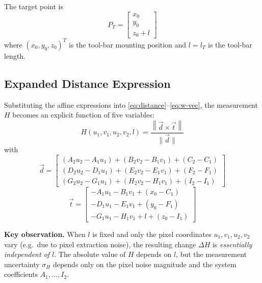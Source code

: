 The target point is
%
\begin{equation}
  P_T =
  \begin{bmatrix} x_0 \\ y_0 \\ z_0 + l \end{bmatrix}
  \label{eq:pt}
\end{equation}
%
where $(x_0, y_0, z_0)^T$ is the tool-bar mounting position
and $l = l_T$ is the tool-bar length.


\subsection{Expanded Distance Expression}
\label{sec:expanded}

Substituting the affine expressions into
\eqref{eq:distance}--\eqref{eq:w-vec},
the measurement $H$ becomes an explicit function of
five variables:
%
\begin{equation}
  H(u_1, v_1, u_2, v_2, l)
    = \frac{
        \left\| \vec{d} \times \vec{t} \right\|
      }{
        \|\vec{d}\|
      }
  \label{eq:H-expanded}
\end{equation}
%
with
%
\begin{equation}
  \vec{d} =
  \begin{bmatrix}
    (A_2 u_2 - A_1 u_1)+(B_2 v_2 - B_1 v_1)+(C_2-C_1) \\
    (D_2 u_2 - D_1 u_1)+(E_2 v_2 - E_1 v_1)+(F_2-F_1) \\
    (G_2 u_2 - G_1 u_1)+(H_2 v_2 - H_1 v_1)+(I_2-I_1)
  \end{bmatrix}
  \label{eq:d-vec}
\end{equation}
%
\begin{equation}
  \vec{t} =
  \begin{bmatrix}
    -A_1 u_1 - B_1 v_1 + (x_0 - C_1) \\
    -D_1 u_1 - E_1 v_1 + (y_0 - F_1) \\
    -G_1 u_1 - H_1 v_1 + l + (z_0 - I_1)
  \end{bmatrix}
  \label{eq:t-vec}
\end{equation}

\textbf{Key observation.}
When $l$ is fixed and only the pixel coordinates
$u_1, v_1, u_2, v_2$ vary
(e.g.\ due to pixel extraction noise),
the resulting change $\Delta H$ is
\emph{essentially independent of $l$}.
%
The absolute value of $H$ depends on $l$,
but the measurement uncertainty $\sigma_H$
depends only on the pixel noise magnitude and the
system coefficients $A_1, \ldots, I_2$.

